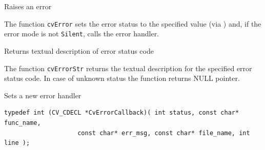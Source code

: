 \label{Error}

Raises an error


\begin{description}
\end{description}

The function \texttt{cvError} sets the error status to the specified value (via ) and, if the error mode is not \texttt{Silent}, calls the error handler.

\label{ErrorStr}

Returns textual description of error status code


\begin{description}
\end{description}

The function \texttt{cvErrorStr} returns the textual description for
the specified error status code. In case of unknown status the function
returns NULL pointer.

\label{RedirectError}

Sets a new error handler

\begin{lstlisting}
typedef int (CV_CDECL *CvErrorCallback)( int status, const char* func_name,
                    const char* err_msg, const char* file_name, int line );
\end{lstlisting}



